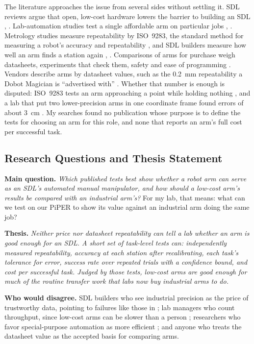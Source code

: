 The literature approaches the issue from several sides without settling it. SDL reviews argue
that open, low-cost hardware lowers the barrier to building an SDL \cite{tom2024},
\cite{doloi2025}. Lab-automation studies test a single affordable arm on particular
jobs \cite{harazono2024}, \cite{rupp2022}. Metrology studies measure repeatability by ISO~9283, the
standard method for measuring a robot's accuracy and repeatability \cite{chajon2026}, and SDL
builders measure how well an arm finds a station again \cite{burger2020}, \cite{zhou2025}.
Comparisons of arms for purchase weigh datasheets, experiments that check them, safety and ease
of programming \cite{ferraguti2019}. Vendors describe arms by datasheet values, such as the
0.2~mm repeatability a Dobot Magician is ``advertised with'' \cite{rupp2022}. Whether that
number is enough is disputed: ISO~9283 tests an arm approaching a point while holding nothing
\cite{harazono2024}, and a lab that put two lower-precision arms in one coordinate frame found
errors of about 3~cm \cite{wattoo2024}. My searches found no publication whose purpose is to
define the tests for choosing an arm for this role, and none that reports an arm's full cost
per successful task.

\subsection{Research Questions and Thesis Statement}

\textbf{Main question.} \emph{Which published tests best show whether a robot arm can serve as
an SDL's automated manual manipulator, and how should a low-cost arm's results be compared with
an industrial arm's?} For my lab, that means: what can we test on our PiPER to show its value
against an industrial arm doing the same job?

\textbf{Thesis.} \emph{Neither price nor datasheet repeatability can tell a lab whether an arm
is good enough for an SDL. A short set of task-level tests can: independently measured
repeatability, accuracy at each station after recalibrating, each task's tolerance for error,
success rate over repeated trials with a confidence bound, and cost per successful task. Judged
by those tests, low-cost arms are good enough for much of the routine transfer work that labs
now buy industrial arms to do.}

\textbf{Who would disagree.} SDL builders who see industrial precision as the price of
trustworthy data, pointing to failures like those in \cite{wattoo2024}; lab managers who count throughput, since low-cost arms can
be slower than a person \cite{rupp2022}; researchers who favor special-purpose automation as
more efficient \cite{tom2024}; and anyone who treats the datasheet value as the accepted basis
for comparing arms.


